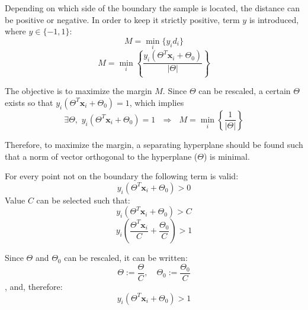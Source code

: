 Depending on which side of the boundary the sample is located, the distance can be positive or negative. In order to keep it strictly positive, term $y$ is introduced, where $y \in \{-1,1\}$:
\begin{equation} 
M = \min_i \big\{y_id_i\big\}
\end{equation}
\begin{equation} 
M = \min_i \left\{ \frac{y_i \left(\Theta^T \mathbf{x}_i + \Theta_0\right)}{\left\vert \Theta \right\vert} \right\}
\end{equation}

The objective is to maximize the margin $M$. Since $\Theta$ can be rescaled, a certain $\Theta$ exists so that $y_i \left(\Theta^T \mathbf{x}_i + \Theta_0\right) = 1$, which implies
\begin{equation} 
\exists \Theta, \,\, y_i \left(\Theta^T \mathbf{x}_i + \Theta_0\right) = 1 \,\,\,\, \Rightarrow \,\,\,\, M = \min_i \left\{ \frac{1}{\left\vert \Theta \right\vert} \right\}
\end{equation}

\noindent Therefore, to maximize the margin, a separating hyperplane should be found such that a norm of vector orthogonal to the hyperplane ($\Theta$) is minimal. 

For every point not on the boundary the following term is valid:
\begin{equation} 
y_i \left(\Theta^T \mathbf{x}_i + \Theta_0\right) > 0 
\end{equation}
Value $C$ can be selected such that:
\begin{equation} 
y_i \left(\Theta^T \mathbf{x}_i + \Theta_0\right) > C
\end{equation}
\begin{equation} 
y_i \left(\frac{\Theta^T \mathbf{x}_i}{C} + \frac{\Theta_0}{C}\right) > 1
\end{equation}

Since $\Theta$ and $\Theta_0$ can be rescaled, it can be written:
\begin{equation} 
\Theta := \frac{\Theta}{C}, \,\,\,\,\,\, \Theta_0 := \frac{\Theta_0}{C}
\end{equation}
, and, therefore:
\begin{equation}  \label{eq:SVM-constraint}
 y_i \left(\Theta^T \mathbf{x}_i + \Theta_0\right) > 1
\end{equation}

